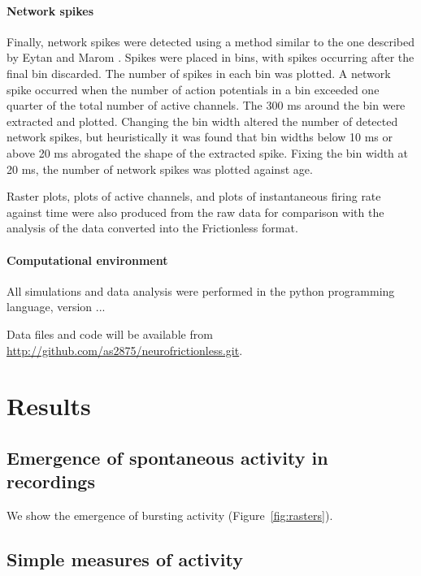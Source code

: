 \documentclass[11pt]{article}
\begin{document}
{\paragraph{Network spikes} Finally, network spikes were detected using a method similar to the one described by Eytan and Marom \cite{Eytan2006}. Spikes were placed in bins, with spikes occurring after the final bin discarded. The number of spikes in each bin was plotted. A network spike occurred when the number of action potentials in a bin exceeded one quarter of the total number of active channels. The 300 ms around the bin were extracted and plotted. Changing the bin width altered the number of detected network spikes, but heuristically it was found that bin widths below 10 ms or above 20 ms abrogated the shape of the extracted spike. Fixing the bin width at 20 ms, the number of network spikes was plotted against age.

\par Raster plots, plots of active channels, and plots of instantaneous firing rate against time were also produced from the raw data for comparison with the analysis of the data converted into the Frictionless format.


\paragraph{Computational environment}

All simulations and data analysis were performed in the python programming
language, version ...

Data files and code will be available from
\url{http://github.com/as2875/neurofrictionless.git}.



\clearpage
\section*{Results}


\subsection*{Emergence of spontaneous activity in recordings}


We show the emergence of bursting activity (Figure~\ref{fig:rasters}).

\subsection*{Simple measures of activity}

}
\end{document}
